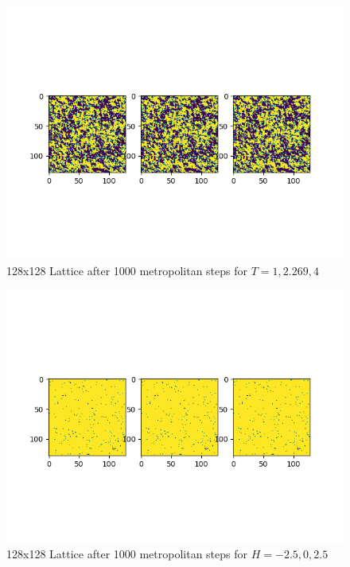 \documentclass[pra,twocolumn,showpacs,amsmath,amssymb]{revtex4-2}
\begin{document}
\begin{figure}[t!]
\includegraphics[scale=0.5]{Lattice.png}
\caption{128x128 Lattice after 1000 metropolitan steps for $T = 1, 2.269, 4$}\label{Poincare0.5}
\end{figure}

\begin{figure}[t!]
\includegraphics[scale=0.5]{LatticeH.png}
\caption{128x128 Lattice after 1000 metropolitan steps for $H = -2.5, 0, 2.5$}\label{Poincare0.5}
\end{figure}
\end{document}
